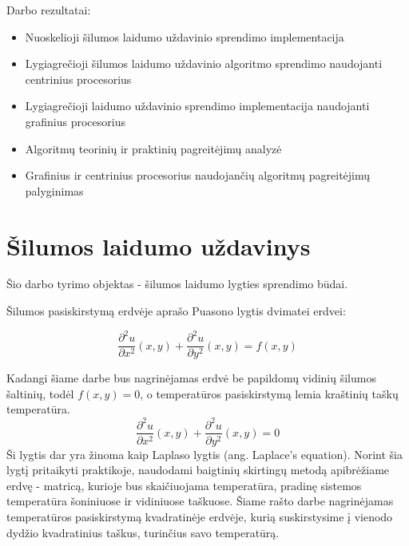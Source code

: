 \documentclass{VUMIFPSbakalaurinis}
\begin{document}
Darbo rezultatai:
\begin{itemize}
    \item Nuoskelioji šilumos laidumo uždavinio sprendimo implementacija
    \item Lygiagrečioji šilumos laidumo uždavinio algoritmo sprendimo naudojanti centrinius procesorius
    \item Lygiagrečioji laidumo uždavinio sprendimo implementacija naudojanti grafinius procesorius
    \item Algoritmų teorinių ir praktinių pagreitėjimų analyzė
    \item Grafinius ir centrinius procesorius naudojančių algoritmų pagreitėjimų palyginimas
\end{itemize}




\section{Šilumos laidumo uždavinys}



Šio darbo tyrimo objektas - šilumos laidumo lygties \cite{burden2011numerical} sprendimo būdai. 


Šilumos pasiskirstymą erdvėje aprašo Puasono lygtis dvimatei erdvei:

\begin{equation}
    \frac{∂^2 u}{∂ x^2}(x,y)+\frac{∂^2 u}{∂ y^2}(x,y) = f(x,y) 
\end{equation}

Kadangi šiame darbe bus nagrinėjamas erdvė be papildomų vidinių šilumos šaltinių, todėl $f(x,y) = 0 $, o temperatūros pasiskirstymą lemia kraštinių taškų temperatūra.
\begin{equation}
    \frac{∂^2 u}{∂ x^2}(x,y)+\frac{∂^2 u}{∂ y^2}(x,y) = 0
\end{equation}
Ši lygtis dar yra žinoma kaip Laplaso lygtis (ang. Laplace's equation).
Norint šia lygtį pritaikyti praktikoje, naudodami baigtinių skirtingų metodą apibrėžiame erdvę - matricą, kurioje bus skaičiuojama temperatūra, pradinę sistemos temperatūra šoniniuose ir vidiniuose taškuose.
Šiame rašto darbe nagrinėjamas temperatūros pasiskirstymą kvadratinėje erdvėje, kurią suskirstysime į vienodo dydžio kvadratinius taškus, turinčius savo temperatūrą.
\end{document}
